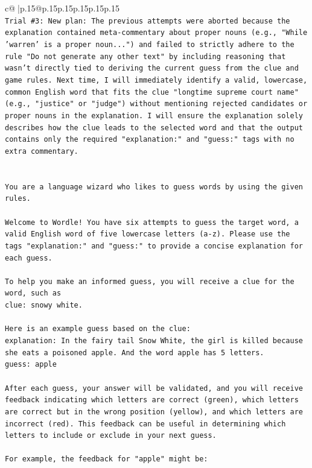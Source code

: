 \documentclass{article}
\begin{document}
{\begin{supertabular}{c@{$\;$}|p{.15\linewidth}@{}p{.15\linewidth}p{.15\linewidth}p{.15\linewidth}p{.15\linewidth}p{.15\linewidth}}
{{{\\ 
\texttt{Trial \#3: New plan: The previous attempts were aborted because the explanation contained meta{-}commentary about proper nouns (e.g., "While 'warren' is a proper noun...") and failed to strictly adhere to the rule "Do not generate any other text" by including reasoning that wasn't directly tied to deriving the current guess from the clue and game rules. Next time, I will immediately identify a valid, lowercase, common English word that fits the clue "longtime supreme court name" (e.g., "justice" or "judge") without mentioning rejected candidates or proper nouns in the explanation. I will ensure the explanation solely describes how the clue leads to the selected word and that the output contains only the required "explanation:" and "guess:" tags with no extra commentary.} \\
\\ 
\\ 
\texttt{You are a language wizard who likes to guess words by using the given rules.} \\
\\ 
\texttt{Welcome to Wordle! You have six attempts to guess the target word, a valid English word of five lowercase letters (a{-}z). Please use the tags "explanation:" and "guess:" to provide a concise explanation for each guess.} \\
\\ 
\texttt{To help you make an informed guess, you will receive a clue for the word, such as} \\
\texttt{clue: snowy white.} \\
\\ 
\texttt{Here is an example guess based on the clue:} \\
\texttt{explanation: In the fairy tail Snow White, the girl is killed because she eats a poisoned apple. And the word apple has 5 letters.} \\
\texttt{guess: apple} \\
\\ 
\texttt{After each guess, your answer will be validated, and you will receive feedback indicating which letters are correct (green), which letters are correct but in the wrong position (yellow), and which letters are incorrect (red). This feedback can be useful in determining which letters to include or exclude in your next guess.} \\
\\ 
\texttt{For example, the feedback for "apple" might be:} \\
}}}
\end{supertabular}}
\end{document}
